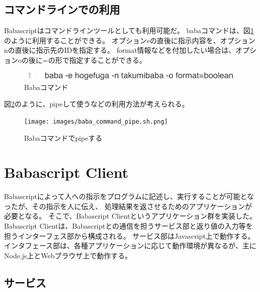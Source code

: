 \subsection{コマンドラインでの利用}\label{ux30b3ux30deux30f3ux30c9ux30e9ux30a4ux30f3ux3067ux306eux5229ux7528}

Babascriptはコマンドラインツールとしても利用可能だ。
babaコマンドは、図\ref{fig:baba_command}のように利用することができる。
オプションeの直後に指示内容を、オプションnの直後に指示先のIDを指定する。
format情報などを付加したい場合は、オプションoの後に=の形で指定することができる。

\begin{figure}[htbp]
  \begin{center}
  \includegraphics[width=.6\linewidth,bb=0 0 465 17]{images/baba_command.sh.png}
  \end{center}
  \caption{Babaコマンド}
  \label{fig:baba_command}
\end{figure}

図\ref{fig:baba_command_pipe}のように、pipeして使うなどの利用方法が考えられる。

\begin{figure}[htbp]
  \begin{center}
  \texttt{[image: images/baba\_command\_pipe.sh.png]}
  \end{center}
  \caption{Babaコマンドでpipeする}
  \label{fig:baba_command_pipe}
\end{figure}

\section{Babascript Client}\label{babascript-client}

Babascriptによって人への指示をプログラムに記述し、実行することが可能となったが、その指示を人に伝え、
処理結果を返させるためのアプリケーションが必要となる。
そこで、Babascript Clientというアプリケーション群を実装した。 Babascript
Clientは、Babascriptとの通信を担うサービス部と返り値の入力等を担うインターフェス部から構成される。
サービス部はJavascript上で動作する。
インタフェース部は、各種アプリケーションに応じて動作環境が異なるが、主にNode.js上とWebブラウザ上で動作する。

\subsection{サービス}\label{ux30b5ux30fcux30d3ux30b9}

